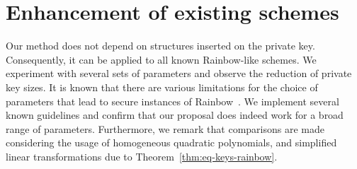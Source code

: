 \documentclass[english]{ufsc-thesis-rn46-2019/ufsc-thesis-rn46-2019}
\theoremstyle{definition}
\begin{document}
\section{Enhancement of existing schemes}\label{sec:exp}

Our method does not depend on structures inserted on the private
key. Consequently, it can be applied to all known Rainbow-like schemes. We
experiment with several sets of parameters and observe the reduction of private
key sizes. It is known that there are various limitations for the choice of
parameters that lead to secure instances of Rainbow~\cite{Petzoldt:201005}. We
implement several known guidelines and confirm that our proposal does indeed
work for a broad range of parameters. Furthermore, we remark that comparisons
are made considering the usage of homogeneous quadratic polynomials, and
simplified linear transformations due to Theorem~\ref{thm:eq-keys-rainbow}.
\end{document}
